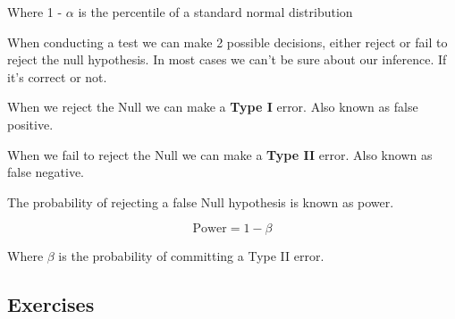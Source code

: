 Where 1 - $\alpha$ is the percentile of a standard normal distribution


\vspace{10pt}

When conducting a test we can make 2 possible decisions, either reject or fail to reject the null hypothesis. In most cases we can't be sure about our inference. If it's correct or not.


\vspace{10pt}

When we reject the Null we can make a \textbf{Type I} error. Also known as false positive.

When we fail to reject the Null we can make a \textbf{Type II} error. Also known as false negative.

\vspace{10pt}

The probability of rejecting a false Null hypothesis is known as power. 

\begin{equation*}
    \text{Power} = 1 - \beta
\end{equation*}

Where $\beta$ is the probability of committing a Type II error.













\subsection{Exercises}  

